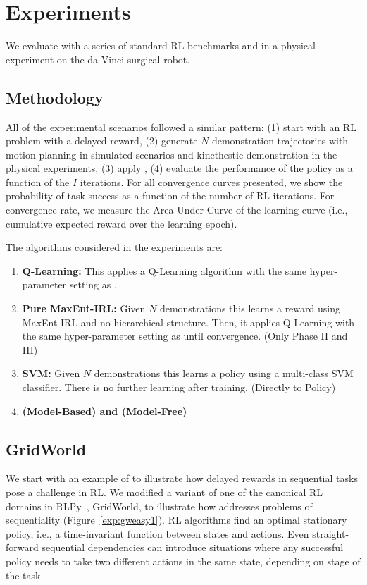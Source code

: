 %

\section{Experiments}\label{sec:exp}
We evaluate \hirl with a series of standard RL benchmarks and in a physical experiment on the da Vinci surgical robot.

\subsection{Methodology}
All of the experimental scenarios followed a similar pattern: (1) start with an RL problem with a delayed reward, (2) generate $N$ demonstration trajectories with motion planning in simulated scenarios and kinethestic demonstration in the physical experiments, (3) apply \hirl, (4) evaluate the performance of the policy as a function of the $I$ iterations.
For all convergence curves presented, we show the probability of task success as a function of the number of RL iterations.
For convergence rate, we measure the Area Under Curve of the learning curve (i.e., cumulative expected reward over the learning epoch).

\noindent The algorithms considered in the experiments are:
\begin{enumerate}[
    topsep=0pt,
    noitemsep,
    leftmargin=*,
    ]
    \item \textbf{Q-Learning: } This applies a Q-Learning algorithm with the same hyper-parameter setting as \hirl. 
    \item \textbf{Pure MaxEnt-IRL: } Given $N$ demonstrations this learns a reward using MaxEnt-IRL and no hierarchical structure. Then, it applies Q-Learning with the same hyper-parameter setting as \hirl until convergence. (Only Phase II and III)
    \item \textbf{SVM: } Given $N$ demonstrations this learns a policy using a multi-class SVM classifier. There is no further learning after training. (Directly to Policy)
    \item \textbf{\HIRL (Model-Based) and \HIRL (Model-Free)} 
\end{enumerate}

\iffalse
\subsection{GridWorld}
We start with an example of to illustrate how delayed rewards in sequential tasks pose a challenge in RL.
We modified a variant of one of the canonical RL domains in RLPy~\cite{RLPy}, GridWorld, to illustrate how \hirl addresses problems of sequentiality (Figure~\ref{exp:gweasy1}). 
RL algorithms find an optimal stationary policy, i.e., a time-invariant function between states and actions.
Even straight-forward sequential dependencies can introduce situations where any successful policy needs to take two different actions in the same state, depending on stage of the task.

